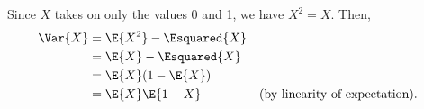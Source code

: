 Since $X$ takes on only the values 0 and 1, we have $X^2=X$.
Then,
\begin{align*}
    \Var{X} &= \E{X^2}-\Esquared{X} \\
    &= \E{X}-\Esquared{X} \\
    &= \E{X}(1-\E{X}) \\
    &= \E{X}\E{1-X} && \text{(by linearity of expectation)}.
\end{align*}

